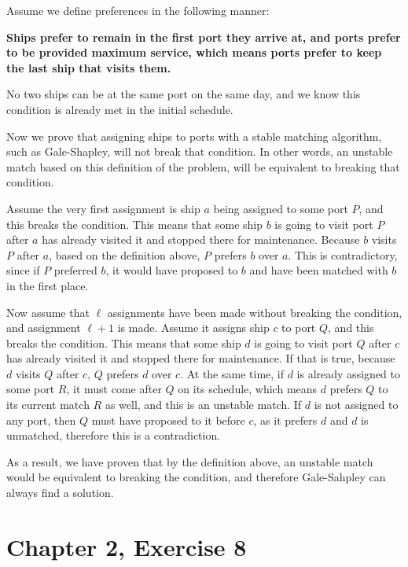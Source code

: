 \documentclass[12pt, letterpaper]{article}
\begin{document}
\noindent Assume we define preferences in the following manner:

\vspace{2mm}
\textbf{Ships prefer to remain in the first port they arrive at, and ports prefer to be provided maximum service, which means ports prefer to keep the last ship that visits them.}
\vspace{2mm}

\noindent No two ships can be at the same port on the same day, and we know this condition is already met in the initial schedule.

\noindent Now we prove that assigning ships to ports with a stable matching algorithm, such as Gale-Shapley, will not break that condition.
In other words, an unstable match based on this definition of the problem, will be equivalent to breaking that condition.

\noindent Assume the very first assignment is ship $a$ being assigned to some port $P$, and this breaks the condition. 
This means that some ship $b$ is going to visit port $P$ after $a$ has already visited it and stopped there for maintenance.
Because $b$ visits $P$ after $a$, based on the definition above, $P$ prefers $b$ over $a$.
This is contradictory, since if $P$ preferred $b$, it would have proposed to $b$ and have been matched with $b$ in the first place.

\noindent Now assume that $\ell$ assignments have been made without breaking the condition, and assignment $\ell + 1$ is made.
Assume it assigns ship $c$ to port $Q$, and this breaks the condition.
This means that some ship $d$ is going to visit port $Q$ after $c$ has already visited it and stopped there for maintenance.
If that is true, because $d$ visits $Q$ after $c$, $Q$ prefers $d$ over $c$.
At the same time, if $d$ is already assigned to some port $R$, it must come after $Q$ on its schedule, which means $d$ prefers $Q$ to its current match $R$ as well, and this is an unstable match.
If $d$ is not assigned to any port, then $Q$ must have proposed to it before $c$, as it prefers $d$ and $d$ is unmatched, therefore this is a contradiction.

\noindent As a result, we have proven that by the definition above, an unstable match would be equivalent to breaking the condition, and therefore Gale-Sahpley can always find a solution.

\clearpage
\section{Chapter 2, Exercise 8}
\end{document}
